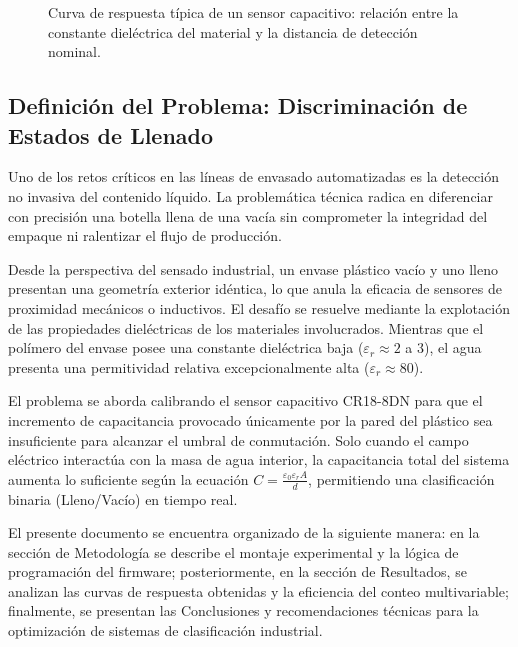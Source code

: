 \documentclass[conference]{IEEEtran}
\begin{document}
\begin{figure}[htbp]
    \centering
    \caption{Curva de respuesta típica de un sensor capacitivo: relación entre la constante dieléctrica del material y la distancia de detección nominal.}
    \label{fig:respuesta_capacitivo}
\end{figure}

\subsection{Definición del Problema: Discriminación de Estados de Llenado}

Uno de los retos críticos en las líneas de envasado automatizadas es la detección no invasiva del contenido líquido. La problemática técnica radica en diferenciar con precisión una botella llena de una vacía sin comprometer la integridad del empaque ni ralentizar el flujo de producción. 

Desde la perspectiva del sensado industrial, un envase plástico vacío y uno lleno presentan una geometría exterior idéntica, lo que anula la eficacia de sensores de proximidad mecánicos o inductivos. El desafío se resuelve mediante la explotación de las propiedades dieléctricas de los materiales involucrados. Mientras que el polímero del envase posee una constante dieléctrica baja ($\varepsilon_r \approx 2$ a $3$), el agua presenta una permitividad relativa excepcionalmente alta ($\varepsilon_r \approx 80$). 

El problema se aborda calibrando el sensor capacitivo CR18-8DN para que el incremento de capacitancia provocado únicamente por la pared del plástico sea insuficiente para alcanzar el umbral de conmutación. Solo cuando el campo eléctrico interactúa con la masa de agua interior, la capacitancia total del sistema aumenta lo suficiente según la ecuación $C = \frac{\varepsilon_0 \varepsilon_r A}{d}$, permitiendo una clasificación binaria (Lleno/Vacío) en tiempo real.

El presente documento se encuentra organizado de la siguiente manera: en la sección de Metodología se describe el montaje experimental y la lógica de programación del firmware; posteriormente, en la sección de Resultados, se analizan las curvas de respuesta obtenidas y la eficiencia del conteo multivariable; finalmente, se presentan las Conclusiones y recomendaciones técnicas para la optimización de sistemas de clasificación industrial.
\end{document}
